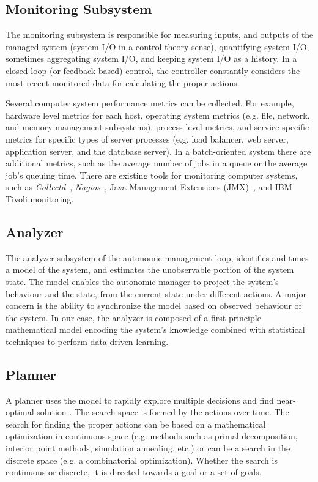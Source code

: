  \subsection{Monitoring Subsystem} The monitoring subsystem is responsible for measuring inputs, and outputs of the managed system (system I/O in a control theory sense), quantifying system I/O, sometimes aggregating system I/O, and keeping system I/O as a history. In a closed-loop (or feedback based) control, the controller constantly considers the most recent monitored data for calculating the proper actions. 

 Several computer system performance metrics can be collected. For example, hardware level metrics for each host, operating system metrics (e.g. file, network, and memory management subsystems), process level metrics, and service specific metrics for specific types of server processes (e.g. load balancer, web server, application server, and the database server). In a batch-oriented system there are additional metrics, such as the average number of jobs in a queue or the average job's queuing time. There are existing tools for monitoring computer systems, such as
 \textit{Collectd}~\cite{collectd}, \textit{Nagios}~\cite{nagios}, Java Management Extensions (JMX)~\cite{jmx}, and IBM Tivoli monitoring\cite{ibm_tivoli_monitoring}. 
  
   \subsection{Analyzer}
    The analyzer subsystem of the autonomic management loop, identifies and tunes a model of the system, and estimates the unobservable portion of the system state. The model enables the autonomic manager to project the system's behaviour and the state, from the current state under different actions.  A major concern is the ability to synchronize the model based on observed behaviour of the system. In our case, the analyzer is composed of a first principle mathematical model encoding the system's knowledge combined with statistical techniques to perform data-driven learning. 

 \subsection{Planner} 
 A planner uses the model to rapidly explore multiple decisions and find near-optimal solution \cite{litoiu_hierarchical_2005,aiber2004autonomic}. The search space is formed by the actions over time. The search for finding the proper actions can be based on a mathematical optimization in continuous space (e.g. methods such as primal decomposition, interior point methods, simulation annealing, etc.) or can be a search in the discrete space (e.g. a combinatorial optimization).
  Whether the search is continuous or discrete, it is directed towards a goal or a set of goals.

